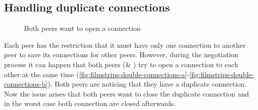 \subsection{Handling duplicate connections}

\begin{figure}[htb!]
  \centering
	\caption{Both peers want to open a connection}
\label{fig:filmstrips-double-connections}
\end{figure}

Each peer has the restriction that it must have only one connection to another peer to save its connections for other peers. However, during the negotiation process it can happen that both peers (\bob \& \claire) try to open a connection to each other at the same time (\vref{fig:filmstrips-double-connections-a}-\vref{fig:filmstrips-double-connections-b}). Both peers are noticing that they have a duplicate connection. Now the issue arises that both peers want to close the duplicate connection and in the worst case both connection are closed afterwards.

